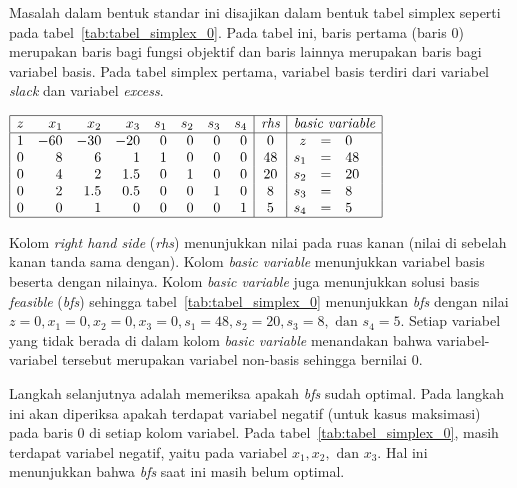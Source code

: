 Masalah dalam bentuk standar ini disajikan dalam bentuk tabel simplex seperti pada tabel~\ref{tab:tabel_simplex_0}. Pada tabel ini, baris pertama (baris 0) merupakan baris bagi fungsi objektif dan baris lainnya merupakan baris bagi variabel basis. Pada tabel simplex pertama, variabel basis terdiri dari variabel \textit{slack} dan variabel \textit{excess}.

\begin{center}
	\label{tab:tabel_simplex_0}
	$
	\begin{array}{|r r r r r r r r|c|r c l|}
		\hline
		z & x_1 & x_2 & x_3 & s_1 & s_2 & s_3 & s_4 & \textit{rhs} & \multicolumn{3}{c|}{\textit{basic variable}}\\
		\hline
		1 & -60 & -30 & -20 & 0 & 0 & 0 & 0 & 0 & z & = & 0\\
		0 & 8 & 6 & 1 & 1 & 0 & 0 & 0 & 48 & s_1 & = & 48\\
		0 & 4 & 2 & 1.5 & 0 & 1 & 0 & 0 & 20 & s_2 & = & 20\\
		0 & 2 & 1.5 & 0.5 & 0 & 0 & 1 & 0 & 8 & s_3 & = & 8\\
		0 & 0 & 1 & 0 & 0 & 0 & 0 & 1 & 5 & s_4 & = & 5\\
		\hline
	\end{array}
	$
\end{center}

Kolom \textit{right hand side} (\textit{rhs}) menunjukkan nilai pada ruas kanan (nilai di sebelah kanan tanda sama dengan). Kolom \textit{basic variable} menunjukkan variabel basis beserta dengan nilainya. Kolom \textit{basic variable} juga menunjukkan solusi basis \textit{feasible} (\textit{bfs}) sehingga tabel~\ref{tab:tabel_simplex_0} menunjukkan \textit{bfs} dengan nilai \(z=0, x_1=0, x_2=0, x_3=0, s_1=48, s_2=20, s_3=8, \text{ dan } s_4=5\). Setiap variabel yang tidak berada di dalam kolom \textit{basic variable} menandakan bahwa variabel-variabel tersebut merupakan variabel non-basis sehingga bernilai 0.

Langkah selanjutnya adalah memeriksa apakah \textit{bfs} sudah optimal. Pada langkah ini akan diperiksa apakah terdapat variabel negatif (untuk kasus maksimasi) pada baris 0 di setiap kolom variabel. Pada tabel~\ref{tab:tabel_simplex_0}, masih terdapat variabel negatif, yaitu pada variabel \(x_1, x_2, \text{ dan } x_3\).
Hal ini menunjukkan bahwa \textit{bfs} saat ini masih belum optimal.

